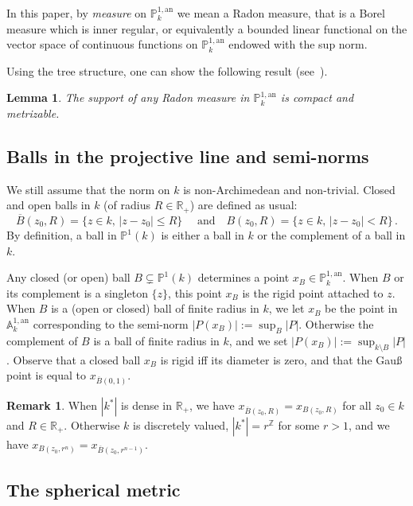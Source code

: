 \documentclass[10pt]{amsart}
\newtheorem{lemm}[theo]{Lemma}\newtheorem{prop}[theo]{Proposition}\newtheorem{coro}[theo]{Corollary}\newtheorem{conj}[theo]{Conjecture}
\theoremstyle{definition}\newtheorem{defi}[theo]{Definition}\newtheorem{rema}[theo]{Remark}\newtheorem{exam}[theo]{Example}\newtheorem{exem}[theo]{Example}\newtheorem{nota}[theo]{Notation}
\newcommand{\A}{{\mathbb A}}
\newcommand{\R}{{\mathbb R}}
\newcommand{\Z}{{\mathbb Z}}
\newcommand{\an}{\mathrm{an}}
\newcommand{\PP}{\mathbb{P}}
\begin{document}
In this paper, by \emph{measure} on $\PP^{1,\an}_k$ we mean a Radon measure, that is a Borel measure which is inner regular, or equivalently a bounded linear functional on the vector space of continuous functions on $\PP^{1,\an}_k$ endowed with the sup norm.

Using the tree structure, one can show the following result (see~\cite[Lem.~7.15]{valtree}).

\begin{lemm}\label{lem:support}
The support of any Radon measure in $\PP^{1,\an}_k$ is compact and metrizable.
\end{lemm}

\subsection{Balls in the projective line and semi-norms}\label{subsec:balls}

We still assume that the norm on $k$ is non-Archimedean and non-trivial. Closed and open balls in $k$ (of radius $R \in \R_+$) are defined as usual:
\[
\overline{B}(z_0,R)= \{ z\in k, \, | z -z_0| \le R\} \quad\text{ and}\quad {B}(z_0,R)= \{ z\in k, \, | z -z_0| < R\}\,.
\]
By definition, a ball in $\PP^1(k)$ is either a ball in $k$ or the complement of a ball in $k$.

Any closed (or open) ball $B\subsetneq\PP^1(k)$ determines a point $x_B\in \PP^{1,\an}_k$. When $B$ or its complement is a singleton $\{ z\}$, this point $x_B $ is the rigid point attached to $z$. When $B$ is a (open or closed) ball of finite radius in $k$, we let $x_B$ be the point in $\A^{1,\an}_k$ corresponding to the semi-norm $|P(x_B)| := \sup_B |P|$. Otherwise the complement of $B$ is a ball of finite radius in $k$, and we set $|P(x_B)| := \sup_{k\setminus B} |P|$. Observe that a closed ball $x_B$ is rigid iff its diameter is zero, and that the Gau{\ss} point is equal to $x_{\overline{B}(0,1)}$.

\begin{rema}
When $|k^*|$ is dense in $\R_+$, we have $x_{\overline{B}(z_0,R)}=x_{B(z_0,R)}$ for all $z_0\in k$ and $R\in \R_+$. Otherwise $k$ is discretely valued, $|k^*| = r^\Z$ for some $r>1$, and we have $x_{B(z_0,r^n)}= x_{\overline{B}(z_0,r^{n-1})}$.
\end{rema}

\subsection{The spherical metric}
\end{document}
